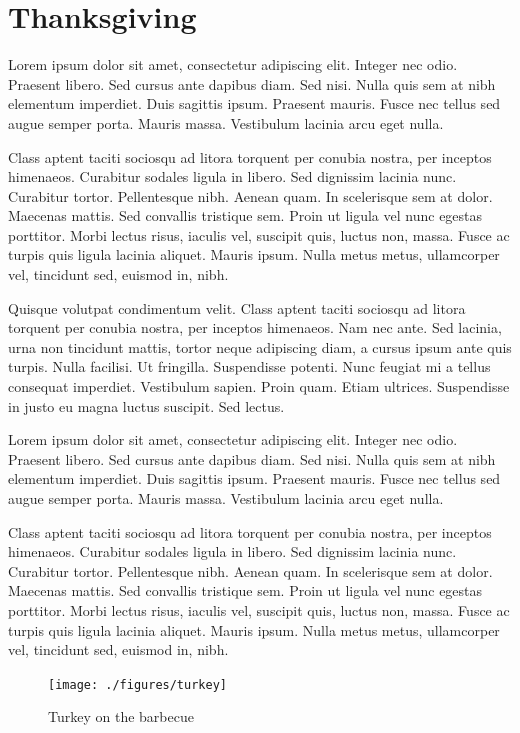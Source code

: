 \documentclass[12pt, final]{book}
\begin{document}
\chapter{Thanksgiving}\label{chapter2}
Lorem ipsum dolor sit amet, consectetur adipiscing elit. Integer nec odio. Praesent libero. Sed cursus ante dapibus diam. Sed nisi. Nulla quis sem at nibh elementum imperdiet. Duis sagittis ipsum. Praesent mauris. Fusce nec tellus sed augue semper porta. Mauris massa. Vestibulum lacinia arcu eget nulla. 

Class aptent taciti sociosqu ad litora torquent per conubia nostra, per inceptos himenaeos. Curabitur sodales ligula in libero. Sed dignissim lacinia nunc. Curabitur tortor. Pellentesque nibh. Aenean quam. In scelerisque sem at dolor. Maecenas mattis. Sed convallis tristique sem. Proin ut ligula vel nunc egestas porttitor. Morbi lectus risus, iaculis vel, suscipit quis, luctus non, massa. Fusce ac turpis quis ligula lacinia aliquet. Mauris ipsum. Nulla metus metus, ullamcorper vel, tincidunt sed, euismod in, nibh. 


Quisque volutpat condimentum velit. Class aptent taciti sociosqu ad litora torquent per conubia nostra, per inceptos himenaeos. Nam nec ante. Sed lacinia, urna non tincidunt mattis, tortor neque adipiscing diam, a cursus ipsum ante quis turpis. Nulla facilisi. Ut fringilla. Suspendisse potenti. Nunc feugiat mi a tellus consequat imperdiet. Vestibulum sapien. Proin quam. Etiam ultrices. Suspendisse in justo eu magna luctus suscipit. Sed lectus. 

Lorem ipsum dolor sit amet, consectetur adipiscing elit. Integer nec odio. Praesent libero. Sed cursus ante dapibus diam. Sed nisi. Nulla quis sem at nibh elementum imperdiet. Duis sagittis ipsum. Praesent mauris. Fusce nec tellus sed augue semper porta. Mauris massa. Vestibulum lacinia arcu eget nulla. 

Class aptent taciti sociosqu ad litora torquent per conubia nostra, per inceptos himenaeos. Curabitur sodales ligula in libero. Sed dignissim lacinia nunc. Curabitur tortor. Pellentesque nibh. Aenean quam. In scelerisque sem at dolor. Maecenas mattis. Sed convallis tristique sem. Proin ut ligula vel nunc egestas porttitor. Morbi lectus risus, iaculis vel, suscipit quis, luctus non, massa. Fusce ac turpis quis ligula lacinia aliquet. Mauris ipsum. Nulla metus metus, ullamcorper vel, tincidunt sed, euismod in, nibh. 

\begin{figure}[t]
\begin{center}
\texttt{[image: ./figures/turkey]}
\end{center}
\caption*{Turkey on the barbecue}
\end{figure}
\clearpage

\newpage

\newpage

\newpage

\newpage

\newpage

\newpage


\end{document}
